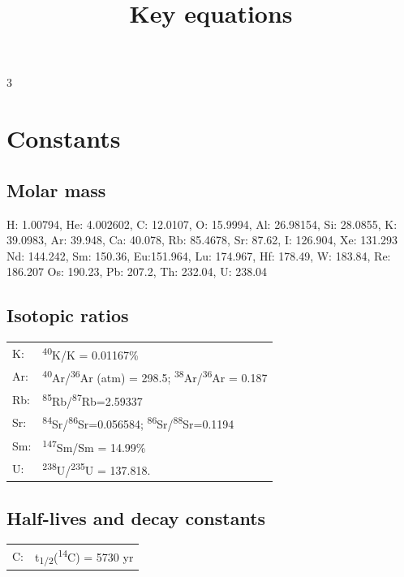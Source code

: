 \documentclass{article}
\title{Key equations}
\author{\vspace{-5ex}}
\date{\vspace{-5ex}}
\begin{document}
\begin{multicols}{3}

\section{Constants}

\subsection{Molar mass}

H: 1.00794, He: 4.002602, C: 12.0107, O: 15.9994, Al: 26.98154, Si:
28.0855, K: 39.0983, Ar: 39.948, Ca: 40.078, Rb: 85.4678, Sr: 87.62,
I: 126.904, Xe: 131.293 Nd: 144.242, Sm: 150.36, Eu:151.964, Lu:
174.967, Hf: 178.49, W: 183.84, Re: 186.207 Os: 190.23, Pb: 207.2, Th:
232.04, U: 238.04

\subsection{Isotopic ratios}

\begin{tabular}{p{.03\linewidth}p{.9\linewidth}}
K: & \textsuperscript{40}K/K = 0.01167\% \\

Ar: & \textsuperscript{40}Ar/\textsuperscript{36}Ar (atm) = 298.5;
\textsuperscript{38}Ar/\textsuperscript{36}Ar = 0.187 \\

Rb: & \textsuperscript{85}Rb/\textsuperscript{87}Rb=2.59337 \\

Sr: & \textsuperscript{84}Sr/\textsuperscript{86}Sr=0.056584;
\textsuperscript{86}Sr/\textsuperscript{88}Sr=0.1194 \\

Sm: & \textsuperscript{147}Sm/Sm = 14.99\% \\

U: & \textsuperscript{238}U/\textsuperscript{235}U = 137.818.

\end{tabular}

\subsection{Half-lives and decay constants}

\begin{tabular}{p{.03\linewidth}p{.9\linewidth}}
C: & t\textsubscript{1/2}(\textsuperscript{14}C) = 5730 yr \\


\end{tabular}
\end{multicols}
\end{document}
